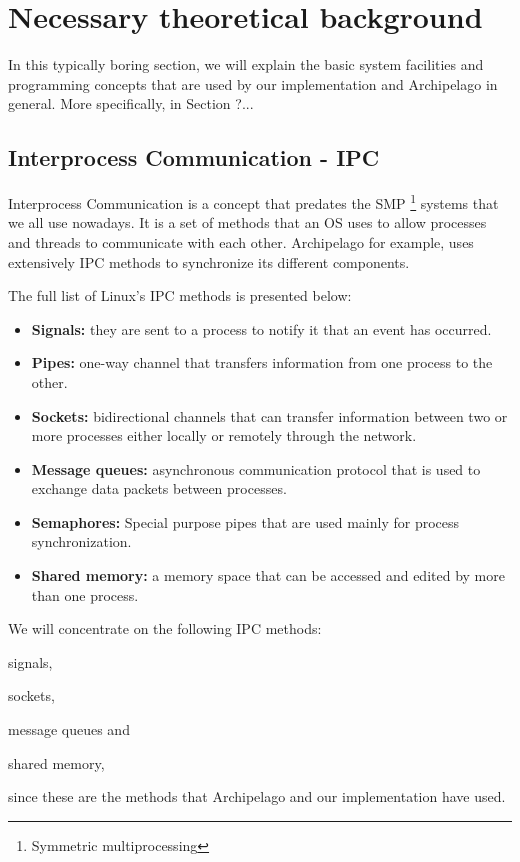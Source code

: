 \chapter{Necessary theoretical background}\label{ch:theory}

In this typically boring section, we will explain the basic system facilities 
and programming concepts that are used by our implementation and Archipelago in 
general. More specifically, in Section ?...

\section{Interprocess Communication - IPC}

Interprocess Communication is a concept that predates the SMP
\footnote{Symmetric multiprocessing}
systems that we all use nowadays. It is a set of methods that an OS uses to 
allow processes and threads to communicate with each other. Archipelago for 
example, uses extensively IPC methods to synchronize its different components.

The full list of Linux's IPC methods is presented below:

\begin{itemize}
	\item \textbf{Signals:} they are sent to a process to notify it that an 
		event has occurred.
	\item \textbf{Pipes:} one-way channel that transfers information from 
		one process to the other.
	\item \textbf{Sockets:} bidirectional channels that can transfer 
		information between two or more processes either locally or 
		remotely through the network.
	\item \textbf{Message queues:} asynchronous communication protocol that 
		is used to exchange data packets between processes.
	\item \textbf{Semaphores:} Special purpose pipes that are used mainly 
		for process synchronization.
	\item \textbf{Shared memory:} a memory space that can be accessed and 
		edited by more than one process.
\end{itemize}

We will concentrate on the following IPC methods:
\begin{inparaenum}[i)]
\item signals,
\item sockets,
\item message queues and
\item shared memory,
\end{inparaenum}
since these are the methods that Archipelago and our implementation have used.

